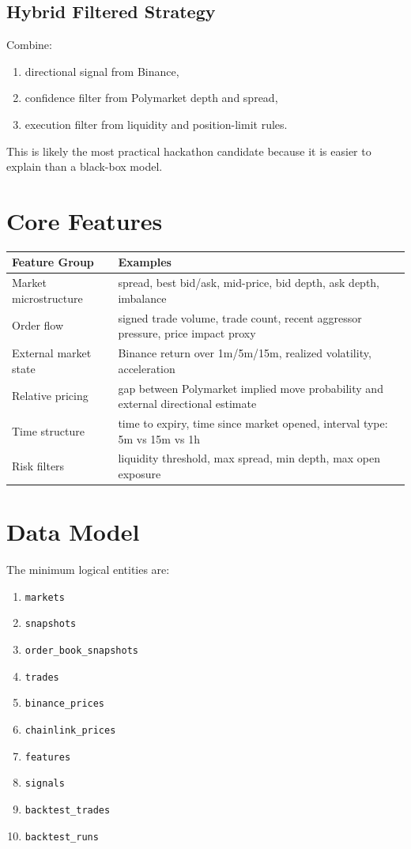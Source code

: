 \documentclass[11pt, letterpaper]{article}
\begin{document}
\subsection{Hybrid Filtered Strategy}

Combine:

\begin{enumerate}[nosep]
    \item directional signal from Binance,
    \item confidence filter from Polymarket depth and spread,
    \item execution filter from liquidity and position-limit rules.
\end{enumerate}

This is likely the most practical hackathon candidate because it is easier to explain than a black-box model.

\section{Core Features}

\begin{longtable}{p{5.4cm}p{7.4cm}}
\toprule
\textbf{Feature Group} & \textbf{Examples} \\
\midrule
\endhead
Market microstructure & spread, best bid/ask, mid-price, bid depth, ask depth, imbalance \\
Order flow & signed trade volume, trade count, recent aggressor pressure, price impact proxy \\
External market state & Binance return over 1m/5m/15m, realized volatility, acceleration \\
Relative pricing & gap between Polymarket implied move probability and external directional estimate \\
Time structure & time to expiry, time since market opened, interval type: 5m vs 15m vs 1h \\
Risk filters & liquidity threshold, max spread, min depth, max open exposure \\
\bottomrule
\end{longtable}

\section{Data Model}

The minimum logical entities are:

\begin{enumerate}[nosep]
    \item \texttt{markets}
    \item \texttt{snapshots}
    \item \texttt{order\_book\_snapshots}
    \item \texttt{trades}
    \item \texttt{binance\_prices}
    \item \texttt{chainlink\_prices}
    \item \texttt{features}
    \item \texttt{signals}
    \item \texttt{backtest\_trades}
    \item \texttt{backtest\_runs}
\end{enumerate}
\end{document}
